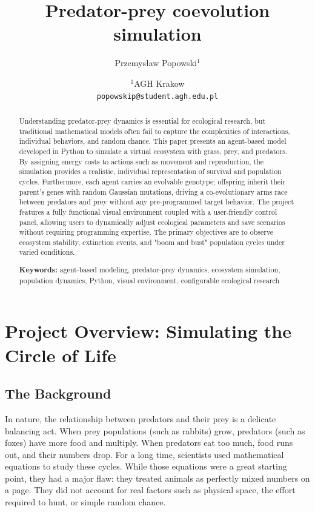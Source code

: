 \documentclass[english]{projectreport}
\author{Przemysław Popowski$^1$}
\title{Predator-prey coevolution simulation}
\date{
	{\small $^1$AGH Krakow \\ \texttt{popowskip@student.agh.edu.pl}\\[1ex]%
        \the\year}
      }
\begin{document}
\maketitle

\thispagestyle{empty}

\begin{abstract}
\noindent Understanding predator-prey dynamics is essential for ecological research, but traditional mathematical models often fail to capture the complexities of interactions, individual behaviors, and random chance. This paper presents an agent-based model developed in Python to simulate a virtual ecosystem with grass, prey, and predators. By assigning energy costs to actions such as movement and reproduction, the simulation provides a realistic, individual representation of survival and population cycles. Furthermore, each agent carries an evolvable genotype; offspring inherit their parent's genes with random Gaussian mutations, driving a co-evolutionary arms race between predators and prey without any pre-programmed target behavior. The project features a fully functional visual environment coupled with a user-friendly control panel, allowing users to dynamically adjust ecological parameters and save scenarios without requiring programming expertise. The primary objectives are to observe ecosystem stability, extinction events, and "boom and bust" population cycles under varied conditions.

\vspace*{0.5em}
\noindent\textbf{Keywords:} agent-based modeling, predator-prey dynamics, ecosystem simulation, population dynamics, Python, visual environment, configurable ecological research
\end{abstract}

\section{Project Overview: Simulating the Circle of Life}
\label{sec:introduction}

\subsection{The Background}
In nature, the relationship between predators and their prey is a delicate balancing act. When prey populations (such as rabbits) grow, predators (such as foxes) have more food and multiply. When predators eat too much, food runs out, and their numbers drop. For a long time, scientists used mathematical equations to study these cycles. While those equations were a great starting point, they had a major flaw: they treated animals as perfectly mixed numbers on a page. They did not account for real factors such as physical space, the effort required to hunt, or simple random chance.
\end{document}

